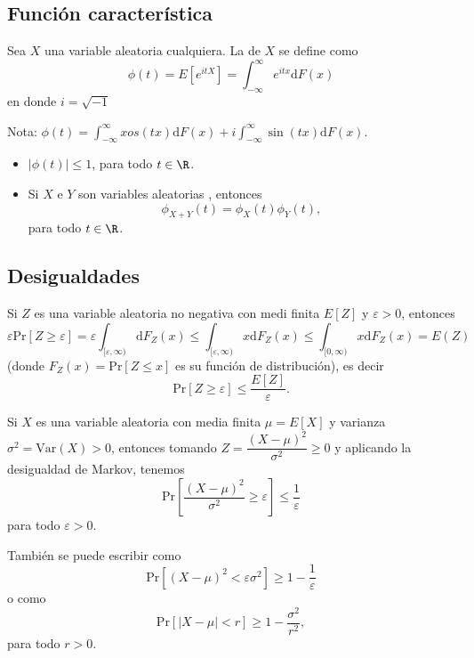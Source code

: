 \subsection*{Función característica}
\begin{tcolorbox}[colback=blue!5!white, colframe=blue!75!black, title=\textbf{Definición}]
Sea $X$ una variable aleatoria cualquiera. La  de  $X$ se define como \[
    \phi(t)=E[e^{itX} ]=\int_{-\infty}^{\infty} e^{itx}\mathrm{d}F(x)  
\] en donde $i=\sqrt{-1} $
\end{tcolorbox}
\begin{tcolorbox}[colback=red!5!white, colframe=red!75!black]
Nota: $\phi(t)=\int_{-\infty}^{\infty} xos(tx)\mathrm{d}F(x)+i \int_{-\infty}^{\infty} \sin(tx)\mathrm{d}F(x).  $
\end{tcolorbox}
\begin{tcolorbox}[colback=blue!5!white, colframe=blue!75!black, title=\textbf{Propiedades}]
\begin{itemize}[label=\textbullet]
    \item {} $|\phi(t)|\le 1$, para todo $t\in \R$.
    \item Si $X$ e  $Y$ son variables aleatorias , entonces \[
    \phi_{X+Y}(t)=\phi_X(t)\phi_Y(t),
    \]para todo $t\in \R$.
\end{itemize}
\end{tcolorbox}
\subsection*{Desigualdades}
\begin{tcolorbox}[colback=blue!5!white, colframe=blue!75!black, title=\textbf{Desigualdad de Markov}]
    Si $Z$ es una variable aleatoria no negativa con medi finita  $E[Z]$ y  $\varepsilon>0 $, entonces \[
        \varepsilon\mathrm{Pr}[Z\ge\varepsilon ]=\varepsilon\int_{[\varepsilon,\infty)}\mathrm{d}F_Z(x)\le \int_{[\varepsilon,\infty)}x\mathrm{d}F_Z(x)\le \int_{[0,\infty)}x\mathrm{d}F_Z(x)=E(Z)
    \] (donde $F_Z(x)=\mathrm{Pr}[Z\le x]$ es su función de distribución), es decir \[
    \mathrm{Pr}[Z\ge \varepsilon]\le \dfrac{E[Z]}{\varepsilon}.
    \] 
\end{tcolorbox}
\begin{tcolorbox}[colback=blue!5!white, colframe=blue!75!black, title=\textbf{Desigualdad de Chebyshev}]
    Si $X$ es una variable aleatoria con media finita $\mu=E[X]$ y varianza $\sigma^2=\mathrm{Var}(X)>0$, entonces tomando $Z=\dfrac{(X-\mu)^2}{\sigma^2}\ge 0$ y aplicando la desigualdad de Markov, tenemos \[
    \mathrm{Pr}\left[ \dfrac{(X-\mu)^2}{\sigma^2}\ge \varepsilon \right] \le \dfrac{1}{\varepsilon}
    \] para todo $\varepsilon>0$.

    También se puede escribir como \[
        \mathrm{Pr}[(X-\mu)^2<\varepsilon\sigma^2]\ge 1-\dfrac{1}{\varepsilon}
    \] o como \[
    \mathrm{Pr}[|X-\mu|<r]\ge 1-\dfrac{\sigma^2}{r^2},
    \] para todo $r>0$.
\end{tcolorbox}
\newpage

